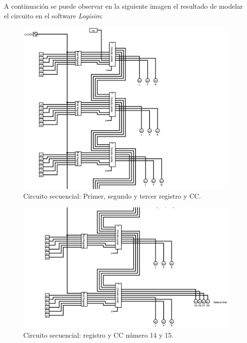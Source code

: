 \documentclass[a4paper]{article}
\begin{document}
A continuación se puede observar en la siguiente imagen el resultado de modelar el circuito en el software \textit{Logisim}:

\newpage


\begin{figure}[!htbp]
    \centering
    \includegraphics[width=1\textwidth]{main1.jpg}
    \caption{Circuito secuencial: Primer, segundo y tercer registro y CC.}
    \label{fig:CircSec1}
\end{figure}

\newpage


\begin{figure}[!htbp]
    \centering
    \includegraphics[width=1\textwidth]{main2.jpg}
    \caption{Circuito secuencial: registro y CC número 14 y 15.}
    \label{fig:CircSec2}
\end{figure}
\end{document}

